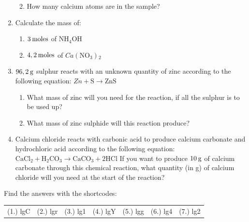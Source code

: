 \begin{enumerate}[noitemsep, label=\textbf{\arabic*}. ]
\begin{enumerate}[noitemsep, label=\textbf{\alph*}. ]
\label{m38717*uid60}\item How many calcium atoms are in the sample?
\end{enumerate}
                \label{m38717*uid61}\item Calculate the mass of:
\label{m38717*id280072}\begin{enumerate}[noitemsep, label=\textbf{\alph*}. ] 
            \label{m38717*uid62}\item $3\phantom{\rule{2pt}{0ex}}\mathrm{moles}$ of $\mathrm{NH}{}_{4}\mathrm{OH}$
\label{m38717*uid63}\item $4,2\phantom{\rule{2pt}{0ex}}\mathrm{moles}$ of $Ca\left(\mathrm{NO}{}_{3}\right){}_{2}$\end{enumerate}
                \label{m38717*uid64}\item $96,2\phantom{\rule{2pt}{0ex}}\mathrm{g}$ sulphur reacts with an unknown quantity of zinc according to the following equation:
$Zn+\mathrm{S}\to \mathrm{ZnS}$\label{m38717*id280179}\begin{enumerate}[noitemsep, label=\textbf{\alph*}. ] 
            \label{m38717*uid65}\item What mass of zinc will you need for the reaction, if all the sulphur is to be used up?
\label{m38717*uid66}\item What mass of zinc sulphide will this reaction produce?
\end{enumerate}
                \label{m38717*uid67}\item Calcium chloride reacts with carbonic acid to produce calcium carbonate and hydrochloric acid according to the following equation:
${\mathrm{CaCl}}_{2}+{\mathrm{H}}_{2}{\mathrm{CO}}_{3}\to {\mathrm{CaCO}}_{3}+2\mathrm{HCl}$
If you want to produce $10\phantom{\rule{2pt}{0ex}}\mathrm{g}$ of calcium carbonate through this chemical reaction, what quantity (in g) of calcium chloride will you need at the start of the reaction?\newline
\end{enumerate}
  \label{m38717**end}
\par {} Find the answers with the shortcodes:
 \par \begin{tabular}[h]{cccccc}
 (1.) lgC  &  (2.) lgr  &  (3.) lg1  &  (4.) lgY  &  (5.) lgg  &  (6.) lg4  &  (7.) lg2  & \end{tabular}
